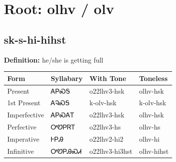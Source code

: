 \documentclass{article}%
\begin{document}
%
\normalsize%
\section*{Root: olhv / olv}%
\subsection*{sk-s-hi-hihst}%
\textbf{Definition: }%
he/she is getting full%
\\[0.5em]%
\begin{tabular}{|l|l|l|l|}%
\hline%
\textbf{Form}&\textbf{Syllabary}&\textbf{With Tone}&\textbf{Toneless}\\%
\hline%
Present&ᎪᏢᏍᎦ&o22lhv3{-}hsk&olhv{-}hsk\\%
1st Present&ᎪᎸᏍᎦ&k{-}olv{-}hsk&k{-}olv{-}hsk\\%
Imperfective&ᎪᏢᏍᎪᎢ&o22lhv3{-}hsk&olhv{-}hsk\\%
Perfective&ᎤᏬᏢᏒᎢ&o22lhv3{-}hs&olhv{-}hs\\%
Imperative&ᎰᏢᎯ&o22lhv2{-}hi2&olhv{-}hi\\%
Infinitive&ᎤᏬᏢᎯᏍᏗ&o22lhv3{-}hi3hst&olhv{-}hihst\\%
\hline%
\end{tabular}%
\\[1em]%
\end{document}
